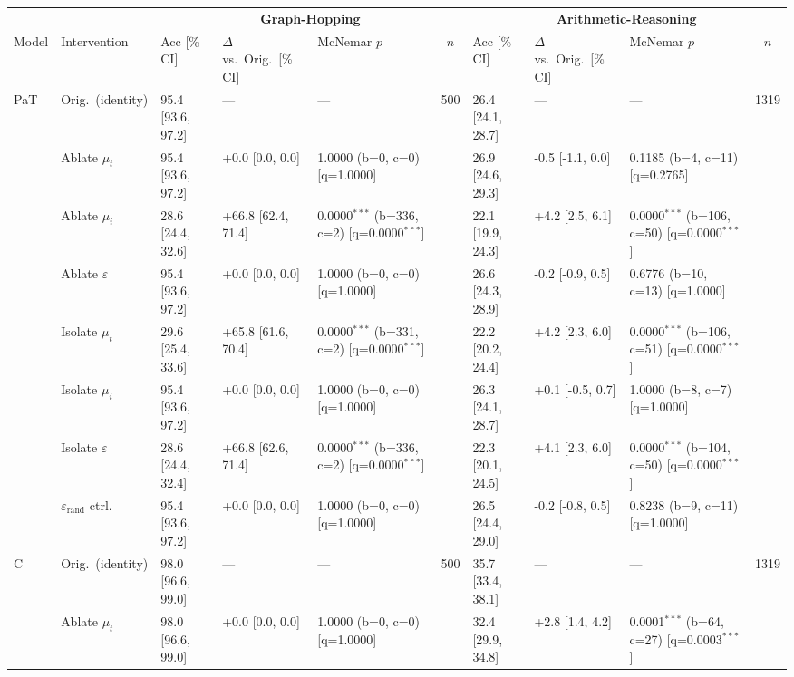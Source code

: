 \begin{table}[h!]
\centering
\tiny
\setlength{\tabcolsep}{4pt}
\begin{tabular}{ll lllc lllc}
\toprule
 & & \multicolumn{4}{c}{\textbf{Graph-Hopping}} & \multicolumn{4}{c}{\textbf{Arithmetic-Reasoning}} \\
\cmidrule(lr){3-6} \cmidrule(lr){7-10}
Model & Intervention & Acc [\% CI] & $\Delta$ vs.\ Orig.\ [\% CI] & McNemar $p$ & $n$ & Acc [\% CI] & $\Delta$ vs.\ Orig.\ [\% CI] & McNemar $p$ & $n$ \\
\midrule
\multirow{8}{*}{PaT} & Orig.\ (identity) & 95.4 [93.6, 97.2] & --- & --- & 500 & 26.4 [24.1, 28.7] & --- & --- & 1319 \\
 & Ablate $\mu_t$ & 95.4 [93.6, 97.2] & +0.0 [0.0, 0.0] & 1.0000 (b=0, c=0) [q=1.0000] &  & 26.9 [24.6, 29.3] & -0.5 [-1.1, 0.0] & 0.1185 (b=4, c=11) [q=0.2765] &  \\
 & Ablate $\mu_i$ & 28.6 [24.4, 32.6] & +66.8 [62.4, 71.4] & 0.0000$^{***}$ (b=336, c=2) [q=0.0000$^{***}$] &  & 22.1 [19.9, 24.3] & +4.2 [2.5, 6.1] & 0.0000$^{***}$ (b=106, c=50) [q=0.0000$^{***}$] &  \\
 & Ablate $\varepsilon$ & 95.4 [93.6, 97.2] & +0.0 [0.0, 0.0] & 1.0000 (b=0, c=0) [q=1.0000] &  & 26.6 [24.3, 28.9] & -0.2 [-0.9, 0.5] & 0.6776 (b=10, c=13) [q=1.0000] &  \\
 & Isolate $\mu_t$ & 29.6 [25.4, 33.6] & +65.8 [61.6, 70.4] & 0.0000$^{***}$ (b=331, c=2) [q=0.0000$^{***}$] &  & 22.2 [20.2, 24.4] & +4.2 [2.3, 6.0] & 0.0000$^{***}$ (b=106, c=51) [q=0.0000$^{***}$] &  \\
 & Isolate $\mu_i$ & 95.4 [93.6, 97.2] & +0.0 [0.0, 0.0] & 1.0000 (b=0, c=0) [q=1.0000] &  & 26.3 [24.1, 28.7] & +0.1 [-0.5, 0.7] & 1.0000 (b=8, c=7) [q=1.0000] &  \\
 & Isolate $\varepsilon$ & 28.6 [24.4, 32.4] & +66.8 [62.6, 71.4] & 0.0000$^{***}$ (b=336, c=2) [q=0.0000$^{***}$] &  & 22.3 [20.1, 24.5] & +4.1 [2.3, 6.0] & 0.0000$^{***}$ (b=104, c=50) [q=0.0000$^{***}$] &  \\
 & $\varepsilon_\mathrm{rand}$ ctrl. & 95.4 [93.6, 97.2] & +0.0 [0.0, 0.0] & 1.0000 (b=0, c=0) [q=1.0000] &  & 26.5 [24.4, 29.0] & -0.2 [-0.8, 0.5] & 0.8238 (b=9, c=11) [q=1.0000] &  \\
\cmidrule(lr){2-10}
\multirow{8}{*}{C} & Orig.\ (identity) & 98.0 [96.6, 99.0] & --- & --- & 500 & 35.7 [33.4, 38.1] & --- & --- & 1319 \\
 & Ablate $\mu_t$ & 98.0 [96.6, 99.0] & +0.0 [0.0, 0.0] & 1.0000 (b=0, c=0) [q=1.0000] &  & 32.4 [29.9, 34.8] & +2.8 [1.4, 4.2] & 0.0001$^{***}$ (b=64, c=27) [q=0.0003$^{***}$] &  \\

\end{tabular}
\end{table}
